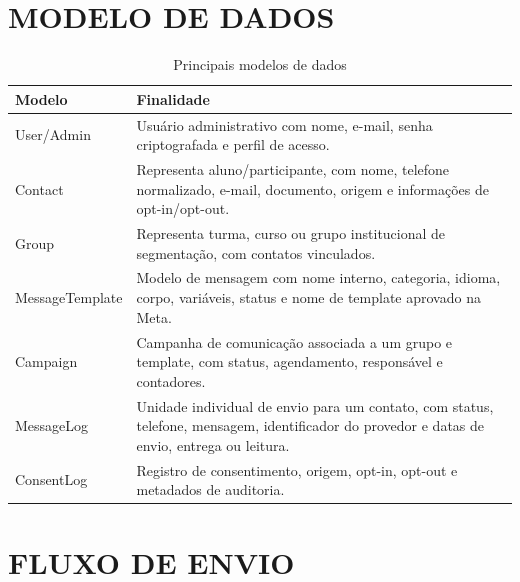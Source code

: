 \documentclass[12pt,letterpaper,oneside]{report}
\begin{document}
\section{MODELO DE DADOS}

\begin{longtable}{|p{3.5cm}|p{10cm}|}
\caption{Principais modelos de dados}\tabularnewline
\hline
\textbf{Modelo} & \textbf{Finalidade}\\
\hline
User/Admin & Usuário administrativo com nome, e-mail, senha criptografada e perfil de acesso.\\
\hline
Contact & Representa aluno/participante, com nome, telefone normalizado, e-mail, documento, origem e informações de opt-in/opt-out.\\
\hline
Group & Representa turma, curso ou grupo institucional de segmentação, com contatos vinculados.\\
\hline
MessageTemplate & Modelo de mensagem com nome interno, categoria, idioma, corpo, variáveis, status e nome de template aprovado na Meta.\\
\hline
Campaign & Campanha de comunicação associada a um grupo e template, com status, agendamento, responsável e contadores.\\
\hline
MessageLog & Unidade individual de envio para um contato, com status, telefone, mensagem, identificador do provedor e datas de envio, entrega ou leitura.\\
\hline
ConsentLog & Registro de consentimento, origem, opt-in, opt-out e metadados de auditoria.\\
\hline
\end{longtable}

\section{FLUXO DE ENVIO}
\end{document}
